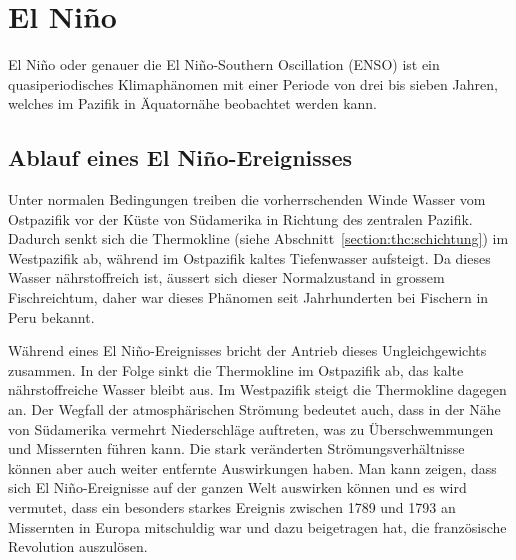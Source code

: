 %
%
%
\section{El Niño\label{section:elnino}}
El Niño oder genauer die El Niño-Southern Oscillation (ENSO) ist ein
quasiperiodisches Klima\-phänomen mit einer Periode von drei bis sieben
Jahren, welches im Pazifik in Äquatornähe beobachtet werden kann.

\subsection{Ablauf eines El Niño-Ereignisses\label{subsection:elnino:ablauf}}
Unter normalen Bedingungen treiben die vorherrschenden Winde Wasser vom
Ostpazifik vor der Küste von Südamerika in Richtung des zentralen Pazifik.
Dadurch senkt sich die Thermokline
(siehe Abschnitt~\ref{section:thc:schichtung})
im Westpazifik ab, während im 
Ostpazifik kaltes Tiefenwasser aufsteigt.
Da dieses Wasser nährstoffreich ist, äussert sich dieser Normalzustand
in grossem Fischreichtum, daher war dieses Phänomen seit Jahrhunderten
bei Fischern in Peru bekannt.

Während eines El Niño-Ereignisses bricht der Antrieb dieses Ungleichgewichts
zusammen.
In der Folge sinkt die Thermokline im Ostpazifik ab,
das kalte nährstoffreiche
Wasser bleibt aus.
Im Westpazifik steigt die Thermokline dagegen an.
Der Wegfall der atmosphärischen Strömung bedeutet auch, dass in der Nähe
von Südamerika vermehrt Niederschläge auftreten, was zu Überschwemmungen
und Missernten führen kann.
Die stark veränderten Strömungsverhältnisse können aber auch weiter entfernte
Auswirkungen haben.
Man kann zeigen, dass sich El Niño-Ereignisse auf der ganzen Welt auswirken
können und es wird vermutet, dass ein besonders starkes Ereignis zwischen
1789 und 1793 an Missernten in Europa mitschuldig war und dazu beigetragen
hat, die französische Revolution auszulösen.

